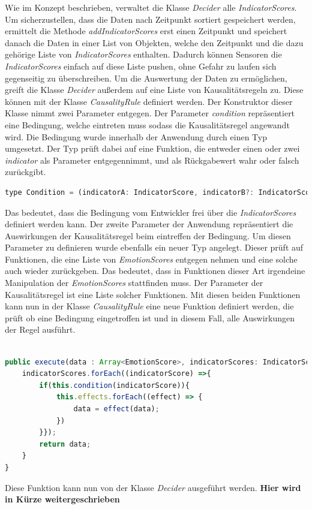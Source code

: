 Wie im Konzept beschrieben, verwaltet die Klasse \textit{Decider} alle \textit{IndicatorScores}. Um sicherzustellen, dass die Daten nach Zeitpunkt sortiert gespeichert werden, ermittelt die Methode \textit{addIndicatorScores} erst einen Zeitpunkt und speichert danach die Daten in einer List von Objekten, welche den Zeitpunkt und die dazu gehörige Liste von \textit{IndicatorScores} enthalten. Dadurch können Sensoren die \textit{IndicatorScores} einfach auf diese Liste pushen, ohne Gefahr zu laufen sich gegenseitig zu überschreiben.\newline
Um die Auswertung der Daten zu ermöglichen, greift die Klasse \textit{Decider} außerdem auf eine Liste von Kausalitätsregeln zu. Diese können mit der Klasse \textit{CausalityRule} definiert werden.
Der Konstruktor dieser Klasse nimmt zwei Parameter entgegen. Der Parameter \textit{condition} repräsentiert eine Bedingung, welche eintreten muss sodass die Kausalitätsregel angewandt wird. Die Bedingung wurde innerhalb der Anwendung durch einen Typ umgesetzt. Der Typ prüft dabei auf eine Funktion, die entweder einen oder zwei \textit{indicator} als Parameter entgegennimmt, und als Rückgabewert wahr oder falsch zurückgibt. 
\begin{lstlisting}[caption={Typ condition}, language=JavaScript]
	type Condition = (indicatorA: IndicatorScore, indicatorB?: IndicatorScore) => boolean;
\end{lstlisting}
Das bedeutet, dass die Bedingung vom Entwickler frei über die \textit{IndicatorScores} definiert werden kann. Der zweite Parameter der Anwendung repräsentiert die Auswirkungen der Kausalitätsregel beim eintreffen der Bedingung. Um diesen Parameter zu definieren wurde ebenfalls ein neuer Typ angelegt. Dieser prüft auf Funktionen, die eine Liste von \textit{EmotionScores} entgegen nehmen und eine solche auch wieder zurückgeben. Das bedeutet, dass in Funktionen dieser Art irgendeine Manipulation der \textit{EmotionScores} stattfinden muss. Der Parameter der Kausalitätsregel ist eine Liste solcher Funktionen. Mit diesen beiden Funktionen kann nun in der Klasse \textit{CausalityRule} eine neue Funktion definiert werden, die prüft ob eine Bedingung eingetroffen ist und in diesem Fall, alle Auswirkungen der Regel ausführt. 
\begin{lstlisting}[caption={execute Funktion der Klasse CausalityRule},language=JavaScript]

public execute(data : Array<EmotionScore>, indicatorScores: IndicatorScore[]) {
	indicatorScores.forEach((indicatorScore) =>{
		if(this.condition(indicatorScore)){
			this.effects.forEach((effect) => {
				data = effect(data);
			})
		}});
		return data;
	}
}

\end{lstlisting}
Diese Funktion kann nun von der Klasse \textit{Decider} ausgeführt werden.
\textbf{Hier wird in Kürze weitergeschrieben}
